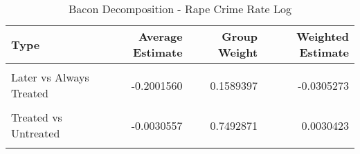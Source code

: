 \begin{table}[H]

\caption{\label{tab:tab:bacondecompositionRape}Bacon Decomposition - Rape Crime Rate Log}
\centering
\begin{tabular}[t]{lrrr}
\toprule
Type & Average Estimate & Group Weight & Weighted Estimate\\
\midrule
\cellcolor{gray!6}{Earlier vs Later Treated} & \cellcolor{gray!6}{-0.0264193} & \cellcolor{gray!6}{0.0683810} & \cellcolor{gray!6}{-0.0026425}\\
Later vs Always Treated & -0.2001560 & 0.1589397 & -0.0305273\\
\cellcolor{gray!6}{Later vs Earlier Treated} & \cellcolor{gray!6}{-0.0106483} & \cellcolor{gray!6}{0.0233921} & \cellcolor{gray!6}{-0.0019283}\\
Treated vs Untreated & -0.0030557 & 0.7492871 & 0.0030423\\
\cellcolor{gray!6}{Total TWFE} & \cellcolor{gray!6}{NaN} & \cellcolor{gray!6}{NaN} & \cellcolor{gray!6}{-0.0320558}\\
\bottomrule
\end{tabular}
\end{table}
